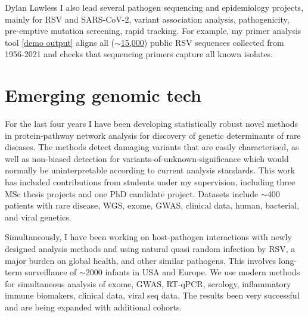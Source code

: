 \documentclass[11pt,a4paper]{article}
\begin{document}
\begin{cv}{Dylan Lawless}
I also lead several pathogen sequencing and epidemiology 
projects, mainly for RSV and SARS-CoV-2, variant association analysis, pathogenicity, pre-emptive mutation screening, rapid tracking. For example, 
my primer analysis tool 
\href{https://lawlessgenomics.com/pages/portfolio_live/Forward_primer_match_TGCCTATGGTTCAGGGCAAG.html}{[demo output]} 
aligns all (\href{https://www.ncbi.nlm.nih.gov/labs/virus/vssi/#/virus?SeqType\%2F_s=Nucleotide&VirusLineage\%2F_ss=Human\%20orthopneumovirus,\%20taxid:11250&SeqType_s=Nucleotide&HostLineage_ss=Homo\%20(humans),\%20taxid:9605&VirusLineage_ss=Human\%20orthopneumovirus\%20(HRSV),\%20taxid:11250&ProtNames_ss=attachment\%20glycoprotein}{$\sim$15,000}) 
public RSV sequences collected from 1956-2021 and checks that sequencing primers capture all known isolates.


\section*{Emerging genomic tech}
For the last four years I have been developing statistically robust novel methods in protein-pathway network analysis for discovery of genetic determinants of rare diseases.
The methods detect damaging variants that are easily characterised, as well as non-biased detection for variants-of-unknown-significance which would normally be uninterpretable according to current analysis standards. 
This work has included contributions from students under my supervision, including three MSc thesis projects and one PhD candidate project. Datasets include $\sim$400 patients with rare disease, WGS, exome, GWAS, clinical data, human, bacterial, and viral genetics.

Simultaneously, I have been working on host-pathogen interactions with newly designed analysis methods and using natural quasi random infection by RSV, a major burden on global health, and other similar pathogens. 
This involves long-term surveillance of $\sim$2000 infants in USA and Europe.
We use modern methods for simultaneous analysis of exome, GWAS, RT-qPCR, serology, inflammatory immune biomakers, clinical data, viral seq data. 
The results been very successful and are being expanded with additional cohorts.  


\end{cv}
\end{document}
